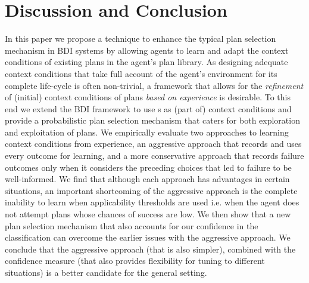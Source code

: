 \section{Discussion and Conclusion}\label{sec:discussion}

In this paper we propose a technique to enhance the typical plan selection mechanism in BDI systems by allowing agents to learn and adapt the context conditions of existing plans in the agent's plan library.
%
As designing adequate context conditions that take full account of the agent's environment for its complete life-cycle is often non-trivial, a framework that allows for the \emph{refinement} of (initial) context conditions of plans \textit{based on experience} is desirable. To this end we extend the BDI framework to use {\dt}s as (part of) context conditions and provide a probabilistic plan selection mechanism that caters for both exploration and exploitation of plans.
%
We empirically evaluate two approaches to learning context conditions from experience, an aggressive approach that records and uses every outcome for learning, and a more conservative approach that records failure outcomes only when it considers the preceding choices that led to failure to be well-informed.
We find that although each approach has advantages in certain situations, an important shortcoming of the aggressive approach is the complete inability to learn when applicability thresholds are used i.e. when the agent does not attempt plans whose chances of success are low. We then show that a new plan selection mechanism that also accounts for our confidence in the \dt classification can overcome the earlier issues with the aggressive approach. We conclude that the aggressive approach (that is also simpler), combined with the confidence measure (that also provides flexibility for tuning to different situations) is a better candidate for the general setting.


